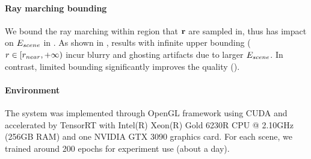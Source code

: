 \paragraph{Ray marching bounding}
We bound the ray marching within region that $\mathbf{r}$ are sampled in, thus has impact on $E_{scene}$ in . As shown in , results with infinite upper bounding ($r\in[r_{near},+\infty)$ incur blurry and ghosting artifacts due to larger $E_{scene}$. In contrast, limited bounding significantly improves the quality (). %


\paragraph{Environment}
The system was implemented through OpenGL framework using CUDA and accelerated by TensorRT with Intel(R) Xeon(R) Gold 6230R CPU @ 2.10GHz (256GB RAM) and one NVIDIA GTX 3090 graphics card.
For each scene, we trained around 200 epochs for experiment use (about a day).